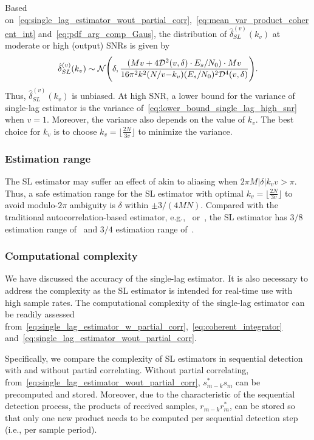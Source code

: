 Based on~\eqref{eq:single_lag_estimator_wout_partial_corr},~\eqref{eq:mean_var_product_coherent_int}
and~\eqref{eq:pdf_arg_comp_Gaus},
the distribution of $\hat{\delta}_{SL}^{(v)}(k_v)$ at moderate or high
(output) SNRs is given by
\begin{equation}
  \label{eq:lower_bound_single_lag_high_snr}
  \hat{\delta}_{SL}^{(v)}(k_v) \sim \mathcal{N} \Bigg(\delta,\frac{(Mv+4\mathcal{D}^2(v,\delta)\cdot E_s/N_0)\cdot Mv}{16\pi^2k^2(N/v{-}k_v)(E_s/N_0)^2\mathcal{D}^4(v,\delta)}\Bigg).
\end{equation}
Thus, $\hat{\delta}_{SL}^{(v)}(k_v)$ is unbiased. 
At high SNR, a lower bound for the variance of single-lag estimator is 
the variance of~\eqref{eq:lower_bound_single_lag_high_snr} when $v=1$.
Moreover, the variance also depends on
the value of $k_v$.
The best choice for $k_v$ is to choose 
$k_v=\lfloor\frac{2N}{3v}\rfloor$ to minimize the variance.

\subsubsection{Estimation range}
The SL estimator may suffer an effect
of akin to aliasing when  $2\pi M|\delta|k_vv{>}\pi$.
Thus, a safe estimation range for the SL estimator with optimal
$k_v=\lfloor\frac{2N}{3v}\rfloor$
to avoid modulo-$2\pi$ ambiguity
is $\delta$ within $\pm 3/(4MN)$. 
Compared with the traditional autocorrelation-based estimator,
e.g.,~\cite{Luise_Reggiannini_95} or~\cite{Fitz_94},
the SL estimator has 
$3/8$ estimation range of~\cite{Luise_Reggiannini_95} and $3/4$ estimation range of~\cite{Fitz_94}.

\subsubsection{Computational complexity}

We have discussed the accuracy of the single-lag estimator.
It is also necessary to address the complexity as the SL estimator
is intended for real-time use with high sample rates.
The computational complexity of the single-lag estimator
can be readily assessed
from~\eqref{eq:single_lag_estimator_w_partial_corr},~\eqref{eq:coherent_integrator}
and~\eqref{eq:single_lag_estimator_wout_partial_corr}.

Specifically, we compare the complexity of SL estimators in sequential detection with and without partial correlating.
Without partial correlating, from~\eqref{eq:single_lag_estimator_wout_partial_corr},
$s_{m-k}^*s_m$ can be precomputed and stored.
Moreover, due to the characteristic of the sequential detection
process,
the products of received samples, $r_{m-k}r_m^*$,
can be stored so that only one new product needs to be computed per
sequential detection step (i.e., per sample period).

